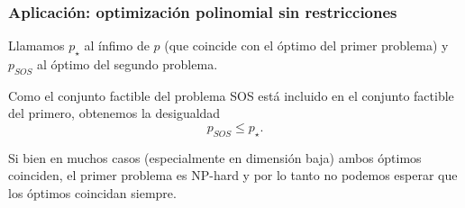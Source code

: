 \documentclass[aspectratio=169,12pt,spanish]{beamer}
\begin{document}

\begin{frame}

\frametitle{Aplicación: optimización polinomial sin restricciones}

Llamamos $p_{\star}$ al ínfimo de $p$ (que coincide con el óptimo del primer problema) y $p_{SOS}$ al óptimo del segundo problema.

Como el conjunto factible del problema SOS está incluido en el conjunto factible del primero, obtenemos la desigualdad
$$
p_{SOS} \le p_{\star}.
$$

Si bien en muchos casos (especialmente en dimensión baja) ambos óptimos coinciden, el primer problema es NP-hard y por lo tanto no podemos esperar que los óptimos coincidan siempre.

\end{frame}

\end{document}
